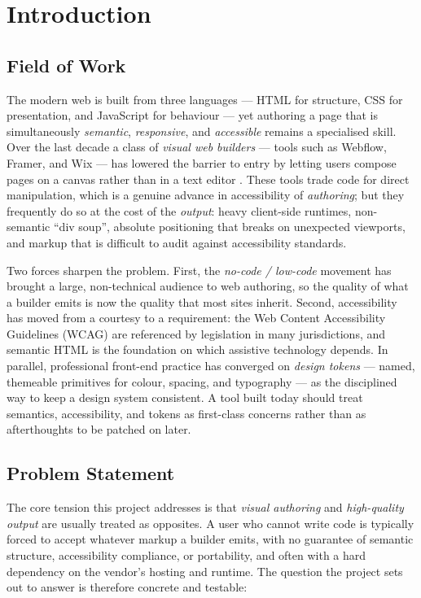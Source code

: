 
\chapter{Introduction}
\label{ch:introduction}

\section{Field of Work}
The modern web is built from three languages --- HTML for structure, CSS for
presentation, and JavaScript for behaviour --- yet authoring a page that is
simultaneously \emph{semantic}, \emph{responsive}, and \emph{accessible} remains a
specialised skill. Over the last decade a class of \emph{visual web builders} ---
tools such as Webflow, Framer, and Wix --- has lowered the barrier to entry by
letting users compose pages on a canvas rather than in a text editor
\cite{webflow,framer,wix}. These tools trade code for direct manipulation, which
is a genuine advance in accessibility of \emph{authoring}; but they frequently do
so at the cost of the \emph{output}: heavy client-side runtimes, non-semantic
``div soup'', absolute positioning that breaks on unexpected viewports, and markup
that is difficult to audit against accessibility standards.

Two forces sharpen the problem. First, the \emph{no-code / low-code} movement has
brought a large, non-technical audience to web authoring, so the quality of what a
builder emits is now the quality that most sites inherit. Second, accessibility
has moved from a courtesy to a requirement: the Web Content Accessibility
Guidelines (WCAG) \cite{wcag21} are referenced by legislation in many
jurisdictions, and semantic HTML \cite{whatwg-html} is the foundation on which
assistive technology depends. In parallel, professional front-end practice has
converged on \emph{design tokens} --- named, themeable primitives for colour,
spacing, and typography --- as the disciplined way to keep a design system
consistent. A tool built today should treat semantics, accessibility, and tokens
as first-class concerns rather than as afterthoughts to be patched on later.

\section{Problem Statement}
The core tension this project addresses is that \emph{visual authoring} and
\emph{high-quality output} are usually treated as opposites. A user who cannot
write code is typically forced to accept whatever markup a builder emits, with no
guarantee of semantic structure, accessibility compliance, or portability, and
often with a hard dependency on the vendor's hosting and runtime. The question the
project sets out to answer is therefore concrete and testable:

